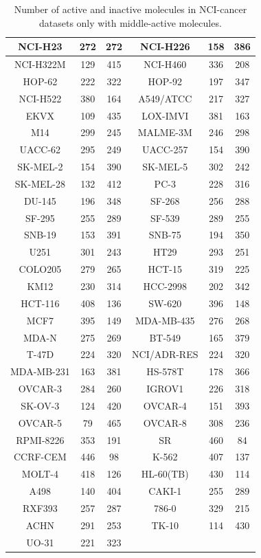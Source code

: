 \documentclass[english]{tktltiki}
\begin{document}
\begin{center}
\begin{table}
\begin{tabular}{|c|c|c||c|c|c|}
NCI-H23& 272& 272 &NCI-H226& 158& 386 \\ \hline
NCI-H322M& 129& 415 &NCI-H460& 336& 208 \\ \hline
HOP-62& 222& 322 &HOP-92& 197& 347 \\ \hline
NCI-H522& 380& 164 &A549/ATCC& 217& 327 \\ \hline
EKVX& 109& 435 &LOX-IMVI& 381& 163 \\ \hline
M14& 299& 245 &MALME-3M& 246& 298 \\ \hline
UACC-62& 295& 249 &UACC-257& 154& 390 \\ \hline
SK-MEL-2& 154& 390 &SK-MEL-5& 302& 242 \\ \hline
SK-MEL-28& 132& 412 &PC-3& 228& 316 \\ \hline
DU-145& 196& 348 &SF-268& 256& 288 \\ \hline
SF-295& 255& 289 &SF-539& 289& 255 \\ \hline
SNB-19& 153& 391 &SNB-75& 194& 350 \\ \hline
U251& 301& 243 &HT29& 293& 251 \\ \hline
COLO205& 279& 265 &HCT-15& 319& 225 \\ \hline
KM12& 230& 314 &HCC-2998& 202& 342 \\ \hline
HCT-116& 408& 136 &SW-620& 396& 148 \\ \hline
MCF7& 395& 149 &MDA-MB-435& 276& 268 \\ \hline
MDA-N& 275& 269 &BT-549& 165& 379 \\ \hline
T-47D& 224& 320 &NCI/ADR-RES& 224& 320 \\ \hline
MDA-MB-231& 163& 381 &HS-578T& 178& 366 \\ \hline
OVCAR-3& 284& 260 &IGROV1& 226& 318 \\ \hline
SK-OV-3& 124& 420 &OVCAR-4& 151& 393 \\ \hline
OVCAR-5& 79& 465 &OVCAR-8& 308& 236 \\ \hline
RPMI-8226& 353& 191 &SR& 460& 84 \\ \hline
CCRF-CEM& 446& 98 &K-562& 407& 137 \\ \hline
MOLT-4& 418& 126 &HL-60(TB)& 430& 114 \\ \hline
A498& 140& 404 &CAKI-1& 255& 289 \\ \hline
RXF393& 257& 287 &786-0& 329& 215 \\ \hline
ACHN& 291& 253 &TK-10& 114& 430 \\ \hline
UO-31& 221& 323 && & \\ \hline

\end{tabular}
\caption[NCI-cancer dataset with middle-active molecules.]{Number of active and inactive molecules in NCI-cancer datasets only with middle-active molecules.}
\label{cancer_statistics_2}
\end{table}
\end{center}
\end{document}
